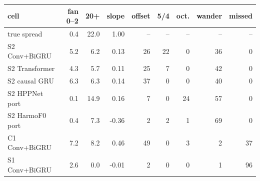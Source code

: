 \begin{tabular}{@{}lrrrrrrrr@{}}
\toprule
cell & fan 0--2 & 20+ & slope & offset & 5/4 & oct. & wander & missed \\
\midrule
true spread & 0.4 & 22.0 & 1.00 & -- & -- & -- & -- & -- \\
S2 Conv+BiGRU & 5.2 & 6.2 & 0.13 & 26 & 22 & 0 & 36 & 0 \\
S2 Transformer & 4.3 & 5.7 & 0.11 & 25 & 7 & 0 & 42 & 0 \\
S2 causal GRU & 6.3 & 6.3 & 0.14 & 37 & 0 & 0 & 40 & 0 \\
S2 HPPNet port & 0.1 & 14.9 & 0.16 & 7 & 0 & 24 & 57 & 0 \\
S2 HarmoF0 port & 0.4 & 7.3 & -0.36 & 2 & 2 & 1 & 69 & 0 \\
C1 Conv+BiGRU & 7.2 & 8.2 & 0.46 & 49 & 0 & 3 & 2 & 37 \\
S1 Conv+BiGRU & 2.6 & 0.0 & -0.01 & 2 & 0 & 0 & 1 & 96 \\
\bottomrule
\end{tabular}
